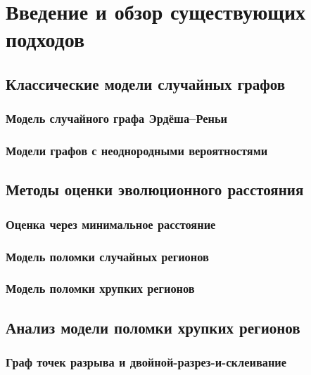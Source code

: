 \chapter{Введение и обзор существующих подходов}
\label{chap:introduction}

\section{Классические модели случайных графов}
\label{sec:random_graph_models}

\subsection{Модель случайного графа Эрдёша–Реньи}
\label{subsec:erdos_renyi}

\subsection{Модели графов с неоднородными вероятностями}
\label{subsec:heterogeneous_graphs}

\section{Методы оценки эволюционного расстояния}
\label{sec:evolutionary_distance_methods}

\subsection{Оценка через минимальное расстояние}
\label{subsec:minimal_distance}

\subsection{Модель поломки случайных регионов}
\label{subsec:random_breakage}

\subsection{Модель поломки хрупких регионов}
\label{subsec:fragile_breakage}

\section{Анализ модели поломки хрупких регионов}
\label{sec:fragile_model_analysis}

\subsection{Граф точек разрыва и двойной-разрез-и-склеивание}
\label{subsec:breakpoint_graph_dcj}

